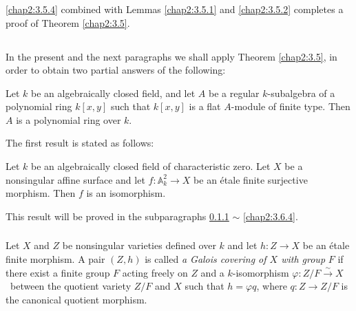 \subsubsection{}\label{chap2:3.5.5}
\begin{lemma*}
  \ref{chap2:3.5.4} combined with Lemmas \ref{chap2:3.5.1} and \ref{chap2:3.5.2}
  completes a proof of Theorem \ref{chap2:3.5}.
\end{lemma*}

\subsection{}\label{chap2:3.6}
In the present and the next paragraphs we shall apply Theorem
\ref{chap2:3.5}, in order to obtain two partial answers of the following:

\begin{conjecture*}
Let $k$ be an algebraically closed field, and let $A$ be a regular
$k$-subalgebra of a polynomial ring $k[x,y]$ such that $k[x,y]$ is a
flat $A$-module of finite type. Then $A$ is a polynomial ring over $k$.
\end{conjecture*}

The first result is stated as follows:

\begin{prop*}
Let $k$ be an algebraically closed field of characteristic zero. Let
$X$ be a nonsingular affine surface and let $f:\mathbb{A}^{2}_{k}\to
X$ be an \'etale finite surjective morphism. Then $f$ is an isomorphism.
\end{prop*}

This result will be proved in the subparagraphs \ref{chap2:3.6.1} $\sim$
\ref{chap2:3.6.4}. 

\subsubsection{}\label{chap2:3.6.1}
\begin{defi*}
  Let $X$ and $Z$ be nonsingular varieties defined over $k$ and let
  $h:Z\to X$ be an \'etale finite morphism. A pair $(Z,h)$ is called
  {\em a Galois covering of $X$ with group} $F$ if there exist a finite
  group $F$ acting freely on $Z$ and a $k$-isomorphism
  $\varphi:Z/F\xrightarrow{\sim}X$\pageoriginale\ between the quotient
  variety $Z/F$ and $X$ such that $h=\varphi q$, where $q:Z\to Z/F$ is
  the canonical quotient morphism.
\end{defi*}

